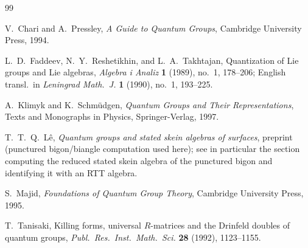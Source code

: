 \documentclass[11pt]{article}
\theoremstyle{plain}
\theoremstyle{definition}
\begin{document}
\begin{thebibliography}{99}

V.~Chari and A.~Pressley,
\emph{A Guide to Quantum Groups},
Cambridge University Press, 1994.

L.~D.~Faddeev, N.~Y.~Reshetikhin, and L.~A.~Takhtajan,
\newblock Quantization of Lie groups and Lie algebras,
\newblock \emph{Algebra i Analiz} \textbf{1} (1989), no.~1, 178--206;
English transl.\ in \emph{Leningrad Math.\ J.} \textbf{1} (1990), no.~1, 193--225.

A.~Klimyk and K.~Schm\"udgen,
\emph{Quantum Groups and Their Representations},
Texts and Monographs in Physics, Springer-Verlag, 1997.

T.~T.~Q.~L\^{e},
\newblock \emph{Quantum groups and stated skein algebras of surfaces},
\newblock preprint (punctured bigon/biangle computation used here); see in particular the section computing the reduced stated skein algebra of the punctured bigon and identifying it with an RTT algebra.

S.~Majid,
\emph{Foundations of Quantum Group Theory},
Cambridge University Press, 1995.

T.~Tanisaki,
\newblock Killing forms, universal {$R$}-matrices and the Drinfeld doubles of quantum groups,
\newblock \emph{Publ.\ Res.\ Inst.\ Math.\ Sci.} \textbf{28} (1992), 1123--1155.

\end{thebibliography}
\end{document}
